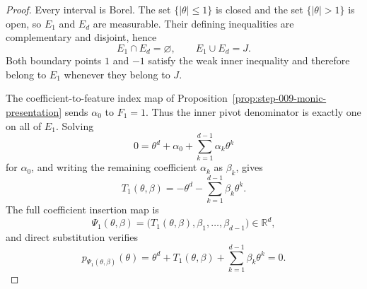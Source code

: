 \begin{proof}
Every interval is Borel. The set \(\{\lvert\theta\rvert\leq1\}\) is closed and the set \(\{\lvert\theta\rvert>1\}\) is open, so \(E_1\) and \(E_d\) are measurable. Their defining inequalities are complementary and disjoint, hence
\begin{equation}
\label{eq:appendix-display-269}
E_1\cap E_d=\varnothing,
\qquad
E_1\cup E_d=J.
\end{equation}
Both boundary points \(1\) and \(-1\) satisfy the weak inner inequality and therefore belong to \(E_1\) whenever they belong to \(J\).

The coefficient-to-feature index map of Proposition~\ref{prop:step-009-monic-presentation} sends \(\alpha_0\) to \(F_1=1\). Thus the inner pivot denominator is exactly one on all of \(E_1\). Solving
\begin{equation}
\label{eq:appendix-display-270}
0=\theta^d+\alpha_0+\sum_{k=1}^{d-1}\alpha_k\theta^k
\end{equation}
for \(\alpha_0\), and writing the remaining coefficient \(\alpha_k\) as \(\beta_k\), gives
\begin{equation}
\label{eq:appendix-display-271}
T_1(\theta,\beta)
=-\theta^d-\sum_{k=1}^{d-1}\beta_k\theta^k.
\end{equation}
The full coefficient insertion map is
\begin{equation}
\label{eq:appendix-display-272}
\Psi_1(\theta,\beta)
=\bigl(T_1(\theta,\beta),\beta_1,\ldots,\beta_{d-1}\bigr)
\in\mathbb R^d,
\end{equation}
and direct substitution verifies
\begin{equation}
\label{eq:appendix-display-273}
p_{\Psi_1(\theta,\beta)}(\theta)
=\theta^d+T_1(\theta,\beta)
+\sum_{k=1}^{d-1}\beta_k\theta^k
=0.
\end{equation}


\end{proof}
